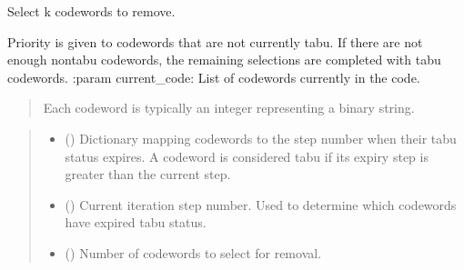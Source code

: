 \documentclass[letterpaper,10pt,english]{sphinxmanual}
\begin{document}

\begin{fulllineitems}
\label{\detokenize{index:hammindist.functions.select_words_to_remove}}
\pysigstartsignatures
\pysiglinewithargsret
{}
{\sphinxparamcomma {}\sphinxparamcomma {}\sphinxparamcomma {}}
{}
\pysigstopsignatures
\sphinxAtStartPar
Select k codewords to remove.

\sphinxAtStartPar
Priority is given to codewords that are not currently tabu.
If there are not enough non\sphinxhyphen{}tabu codewords, the remaining
selections are completed with tabu codewords.
:param current\_code: List of codewords currently in the code.
\begin{quote}

\sphinxAtStartPar
Each codeword is typically an integer
representing a binary string.
\end{quote}
\begin{quote}\begin{description}
\begin{itemize}
\item {} 
\sphinxAtStartPar
{} (\sphinxstyleliteralemphasis{\sphinxupquote{{[}}}\sphinxstyleliteralemphasis{\sphinxupquote{, }}\sphinxstyleliteralemphasis{\sphinxupquote{{]}}}) \textendash{} Dictionary mapping codewords to the
step number when their tabu status expires.
A codeword is considered tabu if its expiry
step is greater than the current step.

\item {} 
\sphinxAtStartPar
{} () \textendash{} Current iteration step number. Used to determine which
codewords have expired tabu status.

\item {} 
\sphinxAtStartPar
{} () \textendash{} Number of codewords to select for removal.


\end{itemize}
\end{description}
\end{quote}
\end{fulllineitems}
\end{document}
